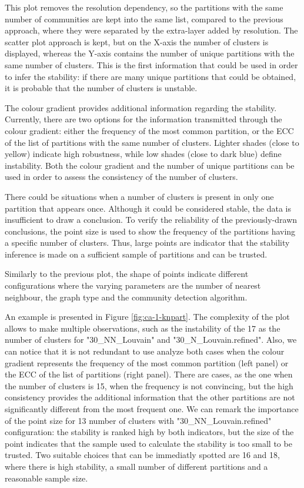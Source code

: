 This plot removes the resolution dependency, so the partitions with the same number of communities are kept into the same list, compared to the previous approach, where they were separated by the extra-layer added by resolution. The scatter plot approach is kept, but on the X-axis the number of clusters is displayed, whereas the Y-axis contains the number of unique partitions with the same number of clusters. This is the first information that could be used in order to infer the stability: if there are many unique partitions that could be obtained, it is probable that the number of clusters is unstable.

The colour gradient provides additional information regarding the stability. Currently, there are two options for the information transmitted through the colour gradient: either the frequency of the most common partition, or the ECC of the list of partitions with the same number of clusters. Lighter shades (close to yellow) indicate high robustness, while low shades (close to dark blue) define instability. Both the colour gradient and the number of unique partitions can be used in order to assess the consistency of the number of clusters.

There could be situations when a number of clusters is present in only one partition that appears once. Although it could be considered stable, the data is insufficient to draw a conclusion. To verify the reliability of the previously-drawn conclusions, the point size is used to show the frequency of the partitions having a specific number of clusters. Thus, large points are indicator that the stability inference is made on a sufficient sample of partitions and can be trusted.

Similarly to the previous plot, the shape of points indicate different configurations where the varying parameters are the number of nearest neighbour, the graph type and the community detection algorithm.

An example is presented in Figure \ref{fig:ca-1-knpart}. The complexity of the plot allows to make multiple observations, such as the instability of the 17 as the number of clusters for "30\_NN\_Louvain" and "30\_N\_Louvain.refined". Also, we can notice that it is not redundant to use analyze both cases when the colour gradient represents the frequency of the most common partition (left panel) or the ECC of the list of partitions (right panel). There are cases, as the one when the number of clusters is 15, when the frequency is not convincing, but the high consistency provides the additional information that the other partitions are not significantly different from the most frequent one. We can remark the importance of the point size for 13 number of clusters with "30\_NN\_Louvain.refined" configuration: the stability is ranked high by both indicators, but the size of the point indicates that the sample used to calculate the stability is too small to be trusted. Two suitable choices that can be immediatly spotted are 16 and 18, where there is high stability, a small number of different partitions and a reasonable sample size.

